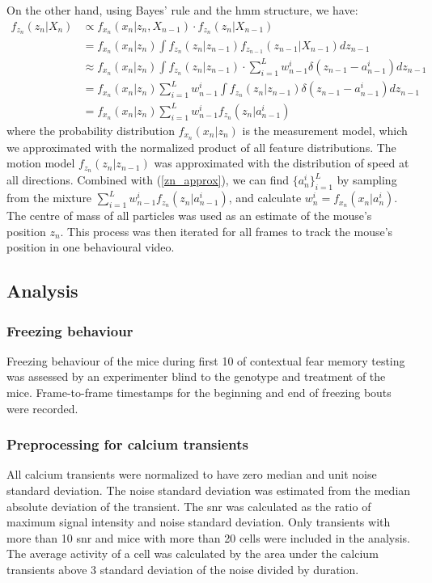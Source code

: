 On the other hand, using Bayes' rule and the \gls{hmm} structure, we have:
\begin{align*}
    f_{z_n}(z_n|X_n) &\propto f_{x_n}(x_n|z_n, X_{n-1}) \cdot f_{z_n}(z_n|X_{n-1}) \\
                     &= f_{x_n}(x_n|z_n) \int f_{z_n}(z_n|z_{n-1})f_{z_{n-1}}(z_{n-1}|X_{n-1})dz_{n-1}  \\
                     &\approx f_{x_n}(x_n|z_n) \int f_{z_n}(z_n|z_{n-1})\cdot \sum_{i=1}^Lw_{n-1}^i\delta(z_{n-1}-a_{n-1}^i)dz_{n-1} \\
                     &= f_{x_n}(x_n|z_n)  \sum_{i=1}^Lw_{n-1}^i \int f_{z_n}(z_n|z_{n-1})\delta(z_{n-1} - a_{n-1}^i)dz_{n-1} \\
                     &= f_{x_n}(x_n|z_n) \sum_{i=1}^Lw_{n-1}^if_{z_n}(z_n|a_{n-1}^i) 
\end{align*}
where the probability distribution $f_{x_n}(x_n|z_n)$ is the measurement model, which we approximated with the normalized product of all feature distributions. The motion model $f_{z_n}(z_n|z_{n-1})$ was approximated with the distribution of speed at all directions. Combined with (\ref{zn_approx}), we can find $\{a_n^i\}_{i=1}^L$ by sampling from the mixture $\sum_{i=1}^Lw_{n-1}^if_{z_n}(z_n|a_{n-1}^i)$, and calculate $w_n^i = f_{x_n}(x_n|a_n^i)$. The centre of mass of all particles was used as an estimate of the mouse's position $z_n$. This process was then iterated for all frames to track the mouse's position in one behavioural video.

\subsection{Analysis}

\subsubsection{Freezing behaviour}
Freezing behaviour of the mice during first \SI{10}{\min} of contextual fear memory testing was assessed by an experimenter blind to the genotype and treatment of the mice. Frame-to-frame timestamps for the beginning and end of freezing bouts were recorded.

\subsubsection{Preprocessing for calcium transients}

All calcium transients were normalized to have zero median and unit noise standard deviation. The noise standard deviation was estimated from the median absolute deviation of the transient. The \gls{snr} was calculated as the ratio of maximum signal intensity and noise standard deviation. Only transients with more than 10 \gls{snr} and mice with more than 20 cells were included in the analysis. The average activity of a cell was calculated by the area under the calcium transients above 3 standard deviation of the noise divided by duration.


